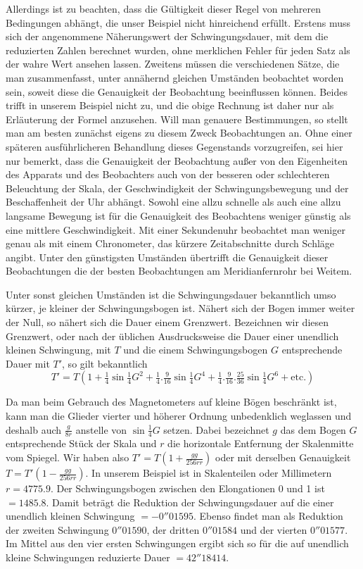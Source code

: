 Allerdings ist zu beachten, dass die Gültigkeit dieser Regel von mehreren Bedingungen abhängt, die unser Beispiel nicht hinreichend erfüllt. Erstens muss sich der angenommene Näherungswert der Schwingungsdauer, mit dem die reduzierten Zahlen berechnet wurden, ohne merklichen Fehler für jeden Satz als der wahre Wert ansehen lassen. Zweitens müssen die verschiedenen Sätze, die man zusammenfasst, unter annähernd gleichen Umständen beobachtet worden sein, soweit diese die Genauigkeit der Beobachtung beeinflussen können. Beides trifft in unserem Beispiel nicht zu, und die obige Rechnung ist daher nur als Erläuterung der Formel anzusehen. Will man genauere Bestimmungen, so stellt man am besten zunächst eigens zu diesem Zweck Beobachtungen an. Ohne einer späteren ausführlicheren Behandlung dieses Gegenstands vorzugreifen, sei hier nur bemerkt, dass die Genauigkeit der Beobachtung außer von den Eigenheiten des Apparats und des Beobachters auch von der besseren oder schlechteren Beleuchtung der Skala, der Geschwindigkeit der Schwingungsbewegung und der Beschaffenheit der Uhr abhängt. Sowohl eine allzu schnelle als auch eine allzu langsame Bewegung ist für die Genauigkeit des Beobachtens weniger günstig als eine mittlere Geschwindigkeit. Mit einer Sekundenuhr beobachtet man weniger genau als mit einem Chronometer, das kürzere Zeitabschnitte durch Schläge angibt. Unter den günstigsten Umständen übertrifft die Genauigkeit dieser Beobachtungen die der besten Beobachtungen am Meridianfernrohr bei Weitem.

Unter sonst gleichen Umständen ist die Schwingungsdauer bekanntlich umso kürzer, je kleiner der Schwingungsbogen ist. Nähert sich der Bogen immer weiter der Null, so nähert sich die Dauer einem Grenzwert. Bezeichnen wir diesen Grenzwert, oder nach der üblichen Ausdrucksweise die Dauer einer unendlich kleinen Schwingung, mit $T$ und die einem Schwingungsbogen $G$ entsprechende Dauer mit $T'$, so gilt bekanntlich
\[
T'=T(1+\tfrac14\sin\tfrac14G^2+\tfrac14.\tfrac9{16}\sin\tfrac14G^4+\tfrac14.\tfrac9{16}.\tfrac{25}{36}\sin\tfrac14G^6+\text{etc.})
\]

Da man beim Gebrauch des Magnetometers auf kleine Bögen beschränkt ist, kann man die Glieder vierter und höherer Ordnung unbedenklich weglassen und deshalb auch $\frac{g}{8r}$ anstelle von $\sin\tfrac14G$ setzen. Dabei bezeichnet $g$ das dem Bogen $G$ entsprechende Stück der Skala und $r$ die horizontale Entfernung der Skalenmitte vom Spiegel. Wir haben also $T'=T(1+\frac{gg}{256rr})$ oder mit derselben Genauigkeit $T=T'(1-\frac{gg}{256rr})$. In unserem Beispiel ist in Skalenteilen oder Millimetern $r=4775.9$. Der Schwingungsbogen zwischen den Elongationen 0 und 1 ist $=1485.8$. Damit beträgt die Reduktion der Schwingungsdauer auf die einer unendlich kleinen Schwingung $=-0''01595$. Ebenso findet man als Reduktion der zweiten Schwingung $0''01590$, der dritten $0''01584$ und der vierten $0''01577$. Im Mittel aus den vier ersten Schwingungen ergibt sich so für die auf unendlich kleine Schwingungen reduzierte Dauer $=42''18414$.

